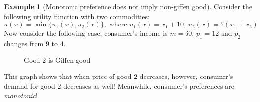 \documentclass[12pt, a4paper]{article}
\theoremstyle{definition}
\newtheorem{example}{Example}
\begin{document}
\begin{example}[Monotonic preference does not imply non-giffen good]
Consider the following utility function with two commodities:
\[
u(x) = \min\{u_1(x), u_2(x) \},\text{ where }u_1(x) = x_1 + 10,\;u_2(x) = 2(x_1+x_2)
\]
Now consider the following case, consumer's income is $m=60$, $p_1 = 12$ and $p_2$ changes from $9$ to $4$. \begin{figure}[h!]
\centering
{}
\caption{Good $2$ is Giffen good}
\end{figure}
This graph shows that when price of good $2$ decreases, however, consumer's demand for good $2$ decreases as well! Meanwhile, consumer's preferences are \emph{monotonic}!
\end{example}
\end{document}
